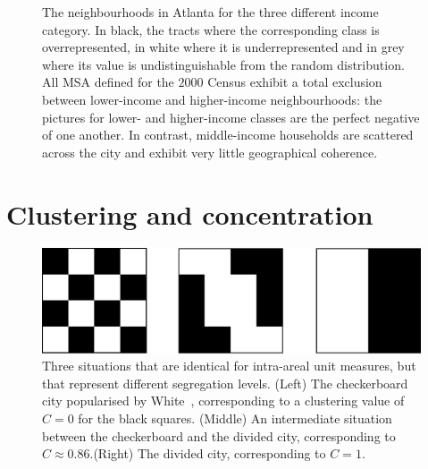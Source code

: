 \begin{figure}
    \caption{The neighbourhoods in Atlanta for the three different
      income category. In black, the tracts where the corresponding
      class is overrepresented, in white where it is
      underrepresented and in grey where its value is
      undistinguishable from the random distribution. All
      MSA defined for the $2000$ Census exhibit a total exclusion between
      lower-income and higher-income
      neighbourhoods: the pictures for lower- and higher-income classes are the
      perfect negative of one another. In contrast, middle-income households
      are scattered across the city and exhibit very little geographical coherence.}
\label{fig:atlanta_neighbourhoods}
\end{figure}


\section{Clustering and concentration}
\label{sec:clustering_and_concentration}



\begin{figure}
    \centering
    \includegraphics[width=\textwidth]{./gfx/chapter-segregation/figure5.pdf}
    \caption{Three situations that are identical for intra-areal unit measures,
        but that represent different segregation levels. (Left) The checkerboard
        city popularised by White~\cite{White:1983}, corresponding to a
        clustering value of $C=0$ for the black squares. (Middle) An
        intermediate situation between the checkerboard and the divided city,
        corresponding to $C \approx 0.86$.(Right) The divided city, corresponding to
        $C=1$. \label{fig:checkerboard}} 
\end{figure}



